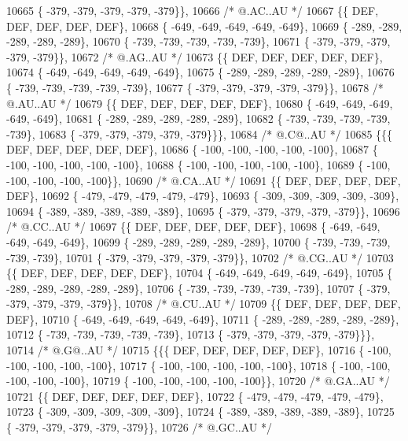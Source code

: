 \begin{DoxyCode}
10665 \{ -379, -379, -379, -379, -379\}\},
10666 \textcolor{comment}{/*  @.AC..AU */}
10667 \{\{  DEF,  DEF,  DEF,  DEF,  DEF\},
10668 \{ -649, -649, -649, -649, -649\},
10669 \{ -289, -289, -289, -289, -289\},
10670 \{ -739, -739, -739, -739, -739\},
10671 \{ -379, -379, -379, -379, -379\}\},
10672 \textcolor{comment}{/*  @.AG..AU */}
10673 \{\{  DEF,  DEF,  DEF,  DEF,  DEF\},
10674 \{ -649, -649, -649, -649, -649\},
10675 \{ -289, -289, -289, -289, -289\},
10676 \{ -739, -739, -739, -739, -739\},
10677 \{ -379, -379, -379, -379, -379\}\},
10678 \textcolor{comment}{/*  @.AU..AU */}
10679 \{\{  DEF,  DEF,  DEF,  DEF,  DEF\},
10680 \{ -649, -649, -649, -649, -649\},
10681 \{ -289, -289, -289, -289, -289\},
10682 \{ -739, -739, -739, -739, -739\},
10683 \{ -379, -379, -379, -379, -379\}\}\},
10684 \textcolor{comment}{/*  @.C@..AU */}
10685 \{\{\{  DEF,  DEF,  DEF,  DEF,  DEF\},
10686 \{ -100, -100, -100, -100, -100\},
10687 \{ -100, -100, -100, -100, -100\},
10688 \{ -100, -100, -100, -100, -100\},
10689 \{ -100, -100, -100, -100, -100\}\},
10690 \textcolor{comment}{/*  @.CA..AU */}
10691 \{\{  DEF,  DEF,  DEF,  DEF,  DEF\},
10692 \{ -479, -479, -479, -479, -479\},
10693 \{ -309, -309, -309, -309, -309\},
10694 \{ -389, -389, -389, -389, -389\},
10695 \{ -379, -379, -379, -379, -379\}\},
10696 \textcolor{comment}{/*  @.CC..AU */}
10697 \{\{  DEF,  DEF,  DEF,  DEF,  DEF\},
10698 \{ -649, -649, -649, -649, -649\},
10699 \{ -289, -289, -289, -289, -289\},
10700 \{ -739, -739, -739, -739, -739\},
10701 \{ -379, -379, -379, -379, -379\}\},
10702 \textcolor{comment}{/*  @.CG..AU */}
10703 \{\{  DEF,  DEF,  DEF,  DEF,  DEF\},
10704 \{ -649, -649, -649, -649, -649\},
10705 \{ -289, -289, -289, -289, -289\},
10706 \{ -739, -739, -739, -739, -739\},
10707 \{ -379, -379, -379, -379, -379\}\},
10708 \textcolor{comment}{/*  @.CU..AU */}
10709 \{\{  DEF,  DEF,  DEF,  DEF,  DEF\},
10710 \{ -649, -649, -649, -649, -649\},
10711 \{ -289, -289, -289, -289, -289\},
10712 \{ -739, -739, -739, -739, -739\},
10713 \{ -379, -379, -379, -379, -379\}\}\},
10714 \textcolor{comment}{/*  @.G@..AU */}
10715 \{\{\{  DEF,  DEF,  DEF,  DEF,  DEF\},
10716 \{ -100, -100, -100, -100, -100\},
10717 \{ -100, -100, -100, -100, -100\},
10718 \{ -100, -100, -100, -100, -100\},
10719 \{ -100, -100, -100, -100, -100\}\},
10720 \textcolor{comment}{/*  @.GA..AU */}
10721 \{\{  DEF,  DEF,  DEF,  DEF,  DEF\},
10722 \{ -479, -479, -479, -479, -479\},
10723 \{ -309, -309, -309, -309, -309\},
10724 \{ -389, -389, -389, -389, -389\},
10725 \{ -379, -379, -379, -379, -379\}\},
10726 \textcolor{comment}{/*  @.GC..AU */}

\end{DoxyCode}
